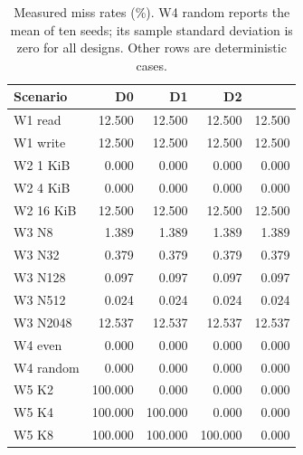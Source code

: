 \begin{table}[htbp]\centering\small
\caption{Measured miss rates (\%). W4 random reports the mean of ten seeds; its sample standard deviation is zero for all designs. Other rows are deterministic cases.}\label{tab:results}
\begin{tabular}{lrrrr}\toprule
Scenario & D0 & D1 & D2 & \dai{}\\\midrule
W1 read & 12.500 & 12.500 & 12.500 & 12.500\\
W1 write & 12.500 & 12.500 & 12.500 & 12.500\\
W2 1 KiB & 0.000 & 0.000 & 0.000 & 0.000\\
W2 4 KiB & 0.000 & 0.000 & 0.000 & 0.000\\
W2 16 KiB & 12.500 & 12.500 & 12.500 & 12.500\\
W3 N8 & 1.389 & 1.389 & 1.389 & 1.389\\
W3 N32 & 0.379 & 0.379 & 0.379 & 0.379\\
W3 N128 & 0.097 & 0.097 & 0.097 & 0.097\\
W3 N512 & 0.024 & 0.024 & 0.024 & 0.024\\
W3 N2048 & 12.537 & 12.537 & 12.537 & 12.537\\
W4 even & 0.000 & 0.000 & 0.000 & 0.000\\
W4 random & 0.000 & 0.000 & 0.000 & 0.000\\
W5 K2 & 100.000 & 0.000 & 0.000 & 0.000\\
W5 K4 & 100.000 & 100.000 & 0.000 & 0.000\\
W5 K8 & 100.000 & 100.000 & 100.000 & 0.000\\
\bottomrule\end{tabular}
\end{table}
